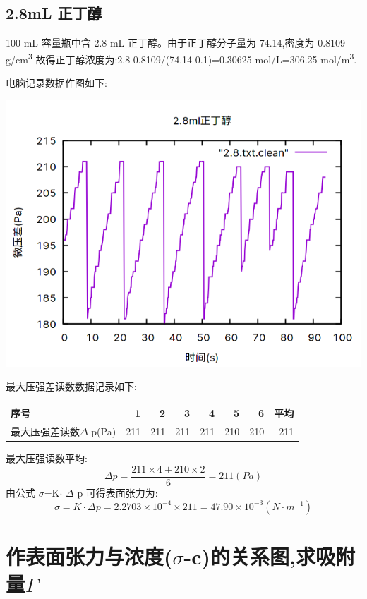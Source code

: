 \documentclass[11pt]{report}
\begin{document}
\section{2.8mL 正丁醇}
\label{sec:org8b35d89}
    100 mL 容量瓶中含 2.8 mL 正丁醇。由于正丁醇分子量为 74.14,密度为 0.8109 g/cm\textsuperscript{3}
故得正丁醇浓度为:2.8\texttimes{} 0.8109/(74.14\texttimes{} 0.1)=0.30625 mol/L=306.25 mol/m\textsuperscript{3}.

电脑记录数据作图如下:
\begin{center}
\includegraphics[width=.9\linewidth]{../img/2.8.png}
\end{center}

最大压强差读数数据记录如下:
\begin{center}
\begin{tabular}{lrrrrrrr}
序号 & 1 & 2 & 3 & 4 & 5 & 6 & 平均\\
\hline
最大压强差读数\(\Delta\) p(Pa) & 211 & 211 & 211 & 211 & 210 & 210 & 211\\
\end{tabular}
\end{center}

最大压强读数平均:
\[
    \Delta p =\frac{211\times 4+210\times 2}{6}=211(Pa)
    \]
由公式 \(\sigma\)=K\(\cdot\) \(\Delta\) p 可得表面张力为:
\[
    \sigma=K\cdot \Delta p=2.2703\times 10^{-4}\times 211=47.90\times 10^{-3}(N\cdot m^{-1})
    \]

\chapter{作表面张力与浓度(\(\sigma\)-c)的关系图,求吸附量\(\Gamma\)}
\label{sec:org39f37c0}
\end{document}
